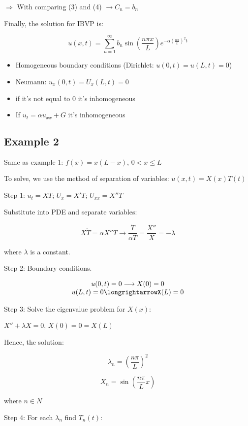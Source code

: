 \hfill

$\Rightarrow$ With comparing (3) and (4) $\rightarrow C_n = b_n$

Finally, the solution for IBVP is:

$$u(x,t) = \sum_{n = 1}^\infty b_n \sin (\frac{n \pi x}{L}) e^{- \alpha \left( \frac{n \pi}{L} \right)^2 t}$$

\begin{itemize}
    \item Homogeneous boundary conditions (Dirichlet: $u(0,t) = u(L,t) = 0$)
    \item Neumann: $u_x(0,t) = U_x (L,t) = 0$
    \item if it's not equal to 0 it's inhomogeneous
    \item If $u_t = \alpha u_{xx} + G$ it's inhomogeneous
\end{itemize}

\subsection{Example 2}

Same as example 1: $f(x) = x(L - x)$, $0 < x \leq L$

To solve, we use the method of separation of variables: $u(x,t) = X(x) T(t)$

Step 1: $u_t = X \dot{T}$; $U_x = X' T$; $U_{xx} = X'' T$

Substitute into PDE and separate variables:

$$X \dot{T} = \alpha X'' T \longrightarrow \frac{\dot{T}}{\alpha T} = \frac{X''}{X} = -\lambda$$

where $\lambda$ is a constant. 

Step 2: Boundary conditions. 

$$\begin{matrix} u(0,t) = 0 \longrightarrow X(0) = 0 \\ u(L,t) = 0 \longrightarrowX(L) = 0 \end{matrix}$$

Step 3: Solve the eigenvalue problem for $X(x)$:

$X'' + \lambda X = 0$, $X(0) = 0 = X(L)$

Hence, the solution:

$$\lambda_n = \left( \frac{n \pi}{L} \right)^2$$

$$X_n = \sin(\frac{n \pi}{L} x)$$

where $n \in N$

Step 4: For each $\lambda_n$ find $T_n(t)$:

